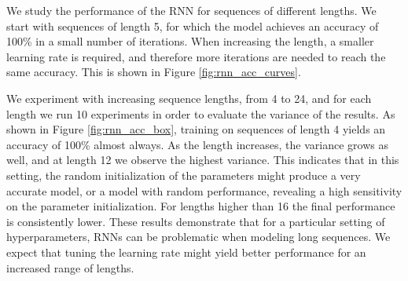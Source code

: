 \documentclass{article}
\begin{document}
We study the performance of the RNN for sequences of different lengths. We start with sequences of length 5, for which the model achieves an accuracy of 100\% in a small number of iterations. When increasing the length, a smaller learning rate is required, and therefore more iterations are needed to reach the same accuracy. This is shown in Figure \ref{fig:rnn_acc_curves}.

We experiment with increasing sequence lengths, from 4 to 24, and for each length we run 10 experiments in order to evaluate the variance of the results. As shown in Figure \ref{fig:rnn_acc_box}, training on sequences of length 4 yields an accuracy of 100\% almost always. As the length increases, the variance grows as well, and at length 12 we observe the highest variance. This indicates that in this setting, the random initialization of the parameters might produce a very accurate model, or a model with random performance, revealing a high sensitivity on the parameter initialization. For lengths higher than 16 the final performance is consistently lower. These results demonstrate that for a particular setting of hyperparameters, RNNs can be problematic when modeling long sequences. We expect that tuning the learning rate might yield better performance for an increased range of lengths.
\end{document}
